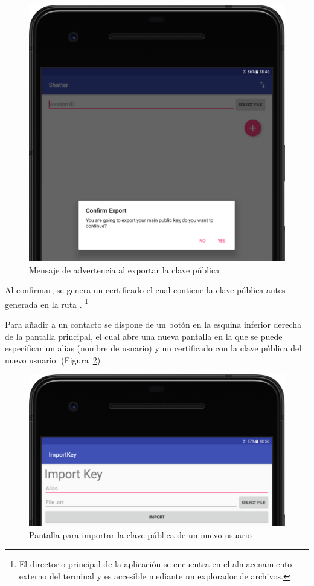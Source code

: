 \begin{figure}[!htb]
  \centering
  \includegraphics[scale=0.4]{Figures/export}
  \decoRule
  \caption[Shatter (Exportar clave pública)]{Mensaje de advertencia al exportar la clave pública}
  \label{fig:export}
\end{figure}

Al confirmar, se genera un certificado el cual contiene la clave pública antes generada en la ruta . \footnote{El directorio principal de la aplicación se encuentra en el almacenamiento externo del terminal y es accesible mediante un explorador de archivos.}

Para añadir a un contacto se dispone de un botón en la esquina inferior derecha de la pantalla principal, el cual abre una nueva pantalla en la que se puede especificar un alias (nombre de usuario) y un certificado con la clave pública del nuevo usuario. (Figura~\ref{fig:import})

\begin{figure}[!htb]
  \centering
  \includegraphics[scale=0.4]{Figures/import}
  \decoRule
  \caption[Shatter (Importar clave pública)]{Pantalla para importar la clave pública de un nuevo usuario}
  \label{fig:import}
\end{figure}

